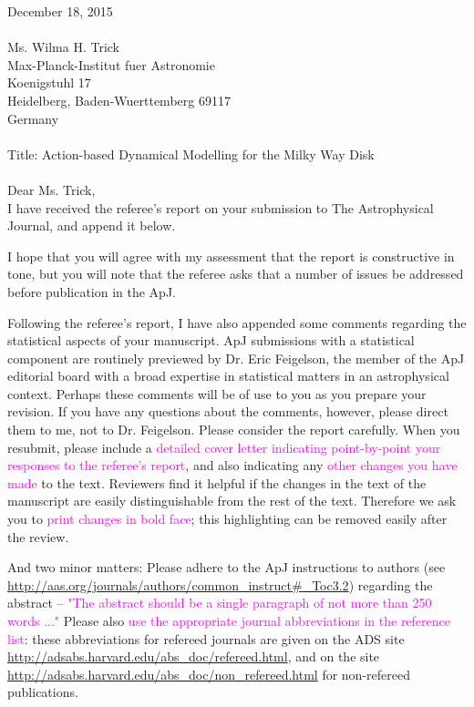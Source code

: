\documentclass[10pt,a4paper]{article}
\newcommand{\Wilma}[1]{\textcolor{Magenta}{#1}}
\begin{document}
December 18, 2015\\\\
Ms. Wilma H. Trick\\
Max-Planck-Institut fuer Astronomie\\
Koenigstuhl 17\\
Heidelberg, Baden-Wuerttemberg 69117\\
Germany\\\\
Title: Action-based Dynamical Modelling for the Milky Way Disk\\\\
Dear Ms. Trick,\\

I have received the referee's report on your submission to The Astrophysical
Journal, and append it below.

I hope that you will agree with my assessment that the report is constructive in
tone, but you will note that the referee asks that a number of issues be addressed
before publication in the ApJ.
  
Following the referee's report, I have also appended some comments regarding the
statistical aspects of your manuscript. ApJ submissions with a statistical component
are routinely previewed by Dr. Eric Feigelson, the member of the ApJ editorial board
with a broad expertise in statistical matters in an astrophysical context. Perhaps
these comments will be of use to you as you prepare your revision. If you have any
questions about the comments, however, please direct them to me, not to Dr.
Feigelson.
Please consider the report carefully. When you resubmit, please include a \Wilma{detailed cover letter indicating point-by-point your responses to the referee's report}, and also indicating any \Wilma{other changes you have made} to the text. Reviewers find it helpful if the changes in the text of the manuscript are easily distinguishable from the rest of the text. Therefore we ask you to \Wilma{print changes in bold face}; this highlighting can be removed easily after the review.

And two minor matters: Please adhere to the ApJ instructions to authors (see
\url{http://aas.org/journals/authors/common_instruct#_Toc3.2}) regarding the abstract --
\Wilma{"The abstract should be a single paragraph of not more than 250 words ..."} Please also \Wilma{use the appropriate journal abbreviations in the reference list}: these
abbreviations for refereed journals are given on the ADS site
\url{http://adsabs.harvard.edu/abs_doc/refereed.html}, and on the site
\url{http://adsabs.harvard.edu/abs_doc/non_refereed.html} for non-refereed publications.
\end{document}
